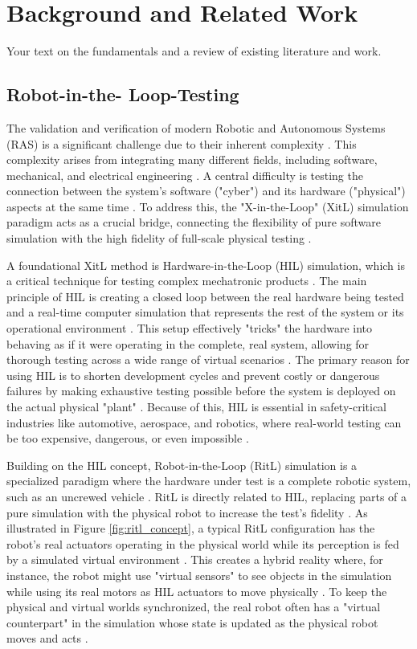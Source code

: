 \chapter{Background and Related Work}
\label{chap:background}
Your text on the fundamentals and a review of existing literature and work.

\section{Robot-in-the-
Loop-Testing}
\label{sec:RitL}
The validation and verification of modern Robotic and Autonomous Systems (RAS) is a significant challenge due to their inherent complexity \cite{Araujo2023}. This complexity arises from integrating many different fields, including software, mechanical, and electrical engineering \cite{Araujo2023}. A central difficulty is testing the connection between the system's software ("cyber") and its hardware ("physical") aspects at the same time \cite{Araujo2023}. To address this, the "X-in-the-Loop" (XitL) simulation paradigm acts as a crucial bridge, connecting the flexibility of pure software simulation with the high fidelity of full-scale physical testing \cite{Brayanov2019}.

A foundational XitL method is Hardware-in-the-Loop (HIL) simulation, which is a critical technique for testing complex mechatronic products \cite{Mihalic2022, Brayanov2019}. The main principle of HIL is creating a closed loop between the real hardware being tested and a real-time computer simulation that represents the rest of the system or its operational environment \cite{Mihalic2022}. This setup effectively "tricks" the hardware into behaving as if it were operating in the complete, real system, allowing for thorough testing across a wide range of virtual scenarios \cite{Brayanov2019}. The primary reason for using HIL is to shorten development cycles and prevent costly or dangerous failures by making exhaustive testing possible before the system is deployed on the actual physical "plant" \cite{Mihalic2022}. Because of this, HIL is essential in safety-critical industries like automotive, aerospace, and robotics, where real-world testing can be too expensive, dangerous, or even impossible \cite{Brayanov2019}.

Building on the HIL concept, Robot-in-the-Loop (RitL) simulation is a specialized paradigm where the hardware under test is a complete robotic system, such as an uncrewed vehicle \cite{Mihalic2022}. RitL is directly related to HIL, replacing parts of a pure simulation with the physical robot to increase the test's fidelity \cite{Hu2005}. As illustrated in Figure \ref{fig:ritl_concept}, a typical RitL configuration has the robot's real actuators operating in the physical world while its perception is fed by a simulated virtual environment \cite{Hu2005, Mihalic2022}. This creates a hybrid reality where, for instance, the robot might use "virtual sensors" to see objects in the simulation while using its real motors as HIL actuators to move physically \cite{Hu2005}. To keep the physical and virtual worlds synchronized, the real robot often has a "virtual counterpart" in the simulation whose state is updated as the physical robot moves and acts \cite{Hu2005}.

